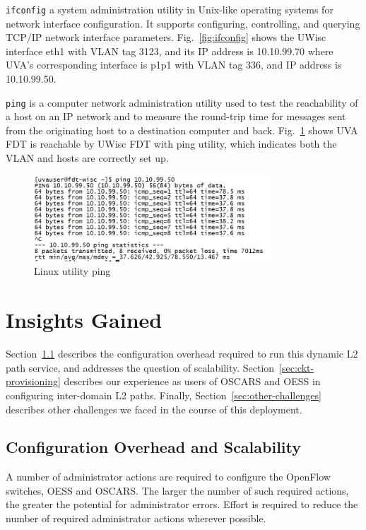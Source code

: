 {\texttt{ifconfig} a system administration utility in Unix-like operating systems for network interface configuration. It supports configuring, controlling, and querying TCP/IP network interface parameters. Fig.~\ref{fig:ifconfig} shows the UWisc interface eth1 with VLAN tag 3123, and its IP address is 10.10.99.70 where UVA's corresponding interface is p1p1 with VLAN tag 336, and IP address is 10.10.99.50.



\texttt{ping} is a computer network administration utility used to test the reachability of a host on an IP network and to measure the round-trip time for messages sent from the originating host to a destination computer and back. Fig.~\ref{fig:ping} shows UVA FDT is reachable by UWisc FDT with ping utility, which indicates both the VLAN and hosts are correctly set up.

\begin{figure}[htb!]
\centering
\includegraphics[width=0.8\textwidth]{figures/ping.png}
\caption{Linux utility ping}
\label{fig:ping}
\end{figure}


\section{Insights Gained}
\label{sec:insight}
Section~\ref{sec:config-ovhd} describes the configuration
overhead required to run this dynamic L2 path service, and addresses
the question of scalability.
Section~\ref{sec:ckt-provisioning} describes
our experience as users of OSCARS and OESS in configuring
inter-domain L2 paths.
Finally, Section~\ref{sec:other-challenges} describes
other challenges we faced in the course of this deployment.

\subsection{Configuration Overhead and Scalability}
\label{sec:config-ovhd}
A number of administrator
actions are required to configure the OpenFlow switches, OESS and OSCARS. The
larger the number of such required actions, the greater the
potential for administrator errors.
Effort is required to reduce the number of required administrator
actions wherever possible.

}
